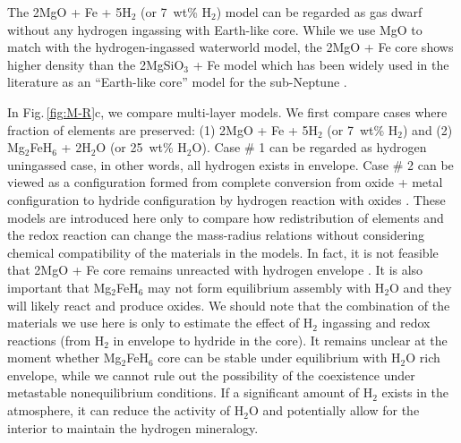\documentclass[draft,jgrga,12pt]{agujournal2019}
\begin{document}
The 2MgO + Fe + 5H$_2$ (or 7~wt\% H$_2$) model can be regarded as gas dwarf without any hydrogen ingassing with Earth-like core.
While we use MgO to match with the hydrogen-ingassed waterworld model, the 2MgO + Fe core shows higher density than the 2MgSiO$_3$ + Fe model which has been widely used in the literature as an ``Earth-like core'' model for the sub-Neptune \cite{valencia_internal_2006, sotin_mass_2007, zeng_detailed_2013}.

In Fig.\,\ref{fig:M-R}c, we compare multi-layer models.
We first compare cases where fraction of elements are preserved: (1) 2MgO + Fe + 5H$_2$ (or 7~wt\% H$_2$) and (2) Mg$_2$FeH$_6$ + 2H$_2$O (or 25~wt\% H$_2$O).
Case \# 1 can be regarded as hydrogen uningassed case, in other words, all hydrogen exists in envelope.
Case \# 2 can be viewed as a configuration formed from complete conversion from oxide + metal configuration to hydride configuration by hydrogen reaction with oxides \cite{horn_building_2025, kim_stability_2023}.
These models are introduced here only to compare how redistribution of elements and the redox reaction can change the mass-radius relations without considering chemical compatibility of the materials in the models.
In fact, it is not feasible that 2MgO + Fe core remains unreacted with hydrogen envelope \cite{horn_reaction_2023}.
It is also important that Mg$_2$FeH$_6$ may not form equilibrium assembly with H$_2$O and they will likely react and produce oxides.  
We should note that the combination of the materials we use here is only to estimate the effect of H$_2$ ingassing and redox reactions (from H$_2$ in envelope to hydride in the core).
It remains unclear at the moment whether Mg$_2$FeH$_6$ core can be stable under equilibrium with H$_2$O rich envelope, while we cannot rule out the possibility of the coexistence under metastable nonequilibrium conditions.
If a significant amount of H$_2$ exists in the atmosphere, it can reduce the activity of H$_2$O and potentially allow for the interior to maintain the hydrogen mineralogy.
\end{document}
